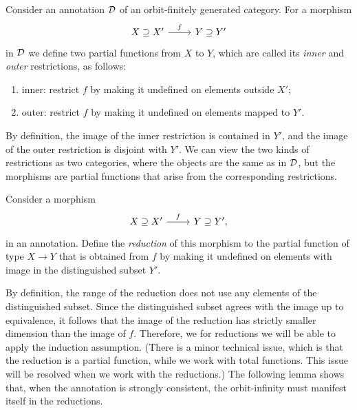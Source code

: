 Consider an annotation ${\mathcal D}$ of an orbit-finitely generated category. For a morphism 
\[
\begin{tikzcd}
X \supseteq X' \ar[r, "f"] & Y \supseteq Y'
\end{tikzcd}
\]
in ${\mathcal D}$ we define two partial functions from $X$ to $Y$, which are called its \emph{inner} and \emph{outer} restrictions, as follows:
\begin{enumerate}
    \item inner: restrict $f$ by making it undefined on elements outside $X'$;
    \item outer: restrict $f$ by making it undefined on elements mapped to $Y'$.
\end{enumerate}
By definition, the image of the inner restriction is contained in $Y'$, and the image of the outer restriction is disjoint with $Y'$. We can view the two kinds of restrictions as two categories, where the objects are the same as in ${\mathcal D}$, but the morphisms are partial functions that arise from the corresponding restrictions.



\begin{definition}
    [Reduction] Consider a morphism 
  \[
        \begin{tikzcd}
        X \supseteq X' \ar[r, "f"] & Y \supseteq Y',
        \end{tikzcd}
        \]
in an annotation. Define the \emph{reduction} of this morphism to  the partial function of type $X \to Y$ that is obtained from $f$ by making it undefined on elements with image in the distinguished subset $Y'$. 
\end{definition}
By definition, the range of the reduction does not use any elements of the distinguished subset. Since the distinguished subset agrees with the image up to equivalence, it follows that the image of the reduction  has strictly smaller dimension than the image of $f$.  Therefore, we for reductions we will be able to apply the induction assumption. (There is a minor technical issue, which is that the reduction is a partial function, while we work with total functions. This issue will be resolved when we work with the reductions.) The following lemma shows that, when the annotation is strongly consistent, the orbit-infinity must manifest itself in the reductions. 

